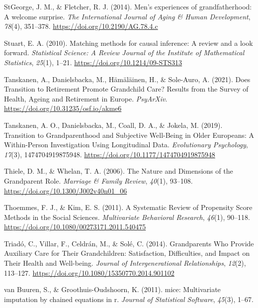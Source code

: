 \documentclass[
  english,
  man, noextraspace]{apa7}
\begin{document}
\leavevmode\hypertarget{ref-stgeorgeMenExperiencesGrandfatherhood2014}{}%
StGeorge, J. M., \& Fletcher, R. J. (2014). Men's experiences of grandfatherhood: A welcome surprise. \emph{The International Journal of Aging \& Human Development}, \emph{78}(4), 351--378. \url{https://doi.org/10.2190/AG.78.4.c}

\leavevmode\hypertarget{ref-stuartMatchingMethodsCausal2010}{}%
Stuart, E. A. (2010). Matching methods for causal inference: A review and a look forward. \emph{Statistical Science: A Review Journal of the Institute of Mathematical Statistics}, \emph{25}(1), 1--21. \url{https://doi.org/10.1214/09-STS313}

\leavevmode\hypertarget{ref-tanskanenDoesTransitionRetirement2021}{}%
Tanskanen, A., Danielsbacka, M., Hämäläinen, H., \& Sole-Auro, A. (2021). Does Transition to Retirement Promote Grandchild Care? Results from the Survey of Health, Ageing and Retirement in Europe. \emph{PsyArXiv}. \url{https://doi.org/10.31235/osf.io/akme6}

\leavevmode\hypertarget{ref-tanskanenTransitionGrandparenthoodSubjective2019}{}%
Tanskanen, A. O., Danielsbacka, M., Coall, D. A., \& Jokela, M. (2019). Transition to Grandparenthood and Subjective Well-Being in Older Europeans: A Within-Person Investigation Using Longitudinal Data. \emph{Evolutionary Psychology}, \emph{17}(3), 1474704919875948. \url{https://doi.org/10.1177/1474704919875948}

\leavevmode\hypertarget{ref-thieleNatureDimensionsGrandparent2006a}{}%
Thiele, D. M., \& Whelan, T. A. (2006). The Nature and Dimensions of the Grandparent Role. \emph{Marriage \& Family Review}, \emph{40}(1), 93--108. \url{https://doi.org/10.1300/J002v40n01_06}

\leavevmode\hypertarget{ref-thoemmesSystematicReviewPropensity2011}{}%
Thoemmes, F. J., \& Kim, E. S. (2011). A Systematic Review of Propensity Score Methods in the Social Sciences. \emph{Multivariate Behavioral Research}, \emph{46}(1), 90--118. \url{https://doi.org/10.1080/00273171.2011.540475}

\leavevmode\hypertarget{ref-triadoGrandparentsWhoProvide2014}{}%
Triadó, C., Villar, F., Celdrán, M., \& Solé, C. (2014). Grandparents Who Provide Auxiliary Care for Their Grandchildren: Satisfaction, Difficulties, and Impact on Their Health and Well-being. \emph{Journal of Intergenerational Relationships}, \emph{12}(2), 113--127. \url{https://doi.org/10.1080/15350770.2014.901102}

\leavevmode\hypertarget{ref-mice2011}{}%
van Buuren, S., \& Groothuis-Oudshoorn, K. (2011). mice: Multivariate imputation by chained equations in r. \emph{Journal of Statistical Software}, \emph{45}(3), 1--67.
\end{document}

